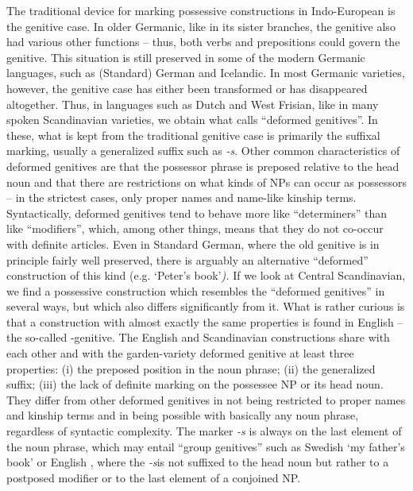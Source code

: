 The traditional device for marking possessive constructions in Indo-European is the genitive case. In older Germanic, like in its sister branches, the genitive also had various other functions – thus, both verbs and prepositions could govern the genitive. This situation is still preserved in some of the modern Germanic languages, such as (Standard) German and Icelandic. In most Germanic varieties, however, the genitive case has either been transformed or has disappeared altogether. Thus, in languages such as Dutch and West Frisian, like in many spoken Scandinavian varieties, we obtain what \citet{KoptjevskajaTamm2003} calls “deformed genitives”. In these, what is kept from the traditional genitive case is primarily the suffixal marking, usually a generalized suffix such as \textit{-s}. Other common characteristics of deformed genitives are that the possessor phrase is preposed relative to the head noun and that there are restrictions on what kinds of NPs can occur as possessors – in the strictest cases, only proper names and name-like kinship terms. Syntactically, deformed genitives tend to behave more like “determiners” than like “modifiers”, which, among other things, means that they do not co-occur with definite articles. Even in Standard German, where the old genitive is in principle fairly well preserved, there is arguably an alternative “deformed” construction of this kind (e.g. ‘Peter’s book’\textit{).} If we look at Central Scandinavian, we find a possessive construction which resembles the “deformed genitives” in several ways, but which also differs significantly from it. What is rather curious is that a construction with almost exactly the same properties is found in English – the so-called -genitive. The English and Scandinavian constructions share with each other and with the garden-variety deformed genitive at least three properties: (i) the preposed position in the noun phrase; (ii) the generalized suffix; (iii) the lack of definite marking on the possessee NP or its head noun. They differ from other deformed genitives in not being restricted to proper names and kinship terms and in being possible with basically any noun phrase, regardless of syntactic complexity. The marker\textit{ {}-s} is always on the last element of the noun phrase, which may entail “group genitives” such as Swedish  ‘my father’s book’ or English , where the\textit{ {}-s}\textstyleLinguisticExample{ }is not suffixed to the head noun but rather to a postposed modifier or to the last element of a conjoined NP. 

